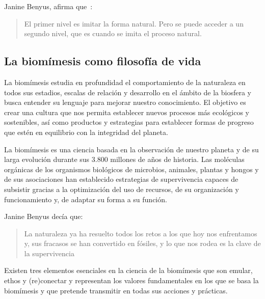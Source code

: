 \documentclass[twocolumn,amsmath,amssymb,aps,floatfix]{revtex4-2}
\begin{document}
\noindent Janine Benyus, afirma que~\cite{Mirat2018}:
\begin{itshape}
   \begin{quote}
      El primer nivel es imitar la forma natural.
      Pero se puede acceder a un segundo nivel, que es cuando se imita el proceso natural.
   \end{quote}
\end{itshape}

\subsection{La biomímesis como filosofía de vida}

La biomímesis estudia en profundidad el comportamiento de la naturaleza en todos
sus estadios, escalas de relación y desarrollo en el ámbito de la biosfera y
busca entender su lenguaje para mejorar nuestro conocimiento. El objetivo es
crear una cultura que nos permita establecer nuevos procesos más ecológicos y
sostenibles, así como productos y estrategias para establecer formas de progreso
que estén en equilibrio con la integridad del planeta.

La biomímesis es una ciencia basada en la observación de nuestro planeta y de
su larga evolución durante sus 3.800 millones de años de historia. Las moléculas
orgánicas de los organismos biológicos de microbios, animales, plantas y hongos
y de sus asociaciones han establecido estrategias de supervivencia capaces de
subsistir gracias a la optimización del uso de recursos, de su organización y
funcionamiento y, de adaptar su forma a su función.

Janine Benyus decía que:

\begin{itshape}
   \begin{quote}
      La naturaleza ya ha resuelto todos los retos a
      los que hoy nos enfrentamos y, sus fracasos se han convertido en fósiles, y lo
      que nos rodea es la clave de la supervivencia
   \end{quote}
\end{itshape}

Existen tres elementos esenciales en la ciencia de la biomímesis que son emular,
ethos y (re)conectar y representan los valores fundamentales en los que se basa
la biomímesis y que pretende transmitir en todas sus acciones y prácticas.
\end{document}
